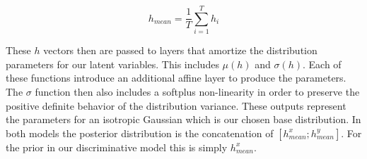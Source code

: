 \begin{equation}
h_{mean} = \frac{1}{T} \sum_{i=1}^{T} h_{i}
\end{equation}

These $h$ vectors then are passed to layers that amortize the distribution parameters for our latent variables. This includes $\mu(h)$ and $\sigma(h)$. Each of these functions introduce an additional affine layer to produce the parameters. The $\sigma$ function then also includes a softplus non-linearity in order to preserve the positive definite behavior of the distribution variance. These outputs represent the parameters for an isotropic Gaussian which is our chosen base distribution. In both models the posterior distribution is the concatenation of $[h_{mean}^{x} ; h_{mean}^{y}]$. For the prior in our discriminative model this is simply $h_{mean}^{x}$.


